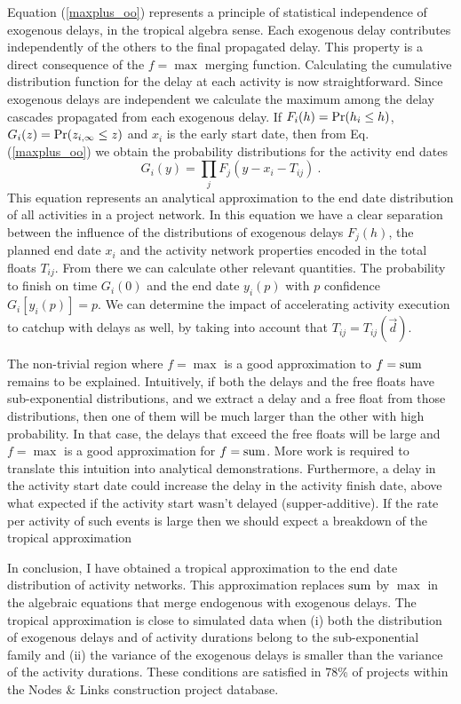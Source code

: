 \documentclass[reprint,aps,prl,amsmath,amssymb,superscriptaddress,showpacs]{revtex4-1}
\begin{document}
Equation (\ref{maxplus_oo}) represents a principle of statistical independence of exogenous delays, in the tropical algebra sense. Each exogenous delay contributes independently of the others to the final propagated delay. This property is a direct consequence of the $f=\max$ merging function. Calculating the cumulative distribution function for the delay at each activity is now straightforward. Since exogenous delays are independent we calculate the maximum among the delay cascades propagated from each exogenous delay.  If $F_i(h)={\rm Pr}(h_i\leq h)$, $G_i(z) = {\rm Pr}(z_{i,\infty}\leq z)$ and $x_i$ is the early start date, then from Eq. (\ref{maxplus_oo}) we obtain the probability distributions for the activity end dates
%
\begin{equation}
G_i(y) = \prod_{j} F_j(y-x_i-T_{ij})\ .
\label{CDF}
\end{equation}
%
This equation represents an analytical approximation to the end date distribution of all activities in a project network. In this equation we have a clear separation between the influence of the distributions of exogenous delays $F_j(h)$, the planned end date $x_i$ and the activity network properties encoded in the total floats $T_{ij}$. From there we can calculate other relevant quantities. The probability to finish on time $G_i(0)$ and the end date $y_i(p)$ with $p$ confidence $G_i[y_i(p)]=p$. We can determine the impact of accelerating activity execution to catchup with delays as well, by taking into account that $T_{ij}=T_{ij}(\vec{d})$.

The non-trivial region where $f=\max$ is a good approximation to $f={\rm sum}$ remains to be explained. Intuitively, if both the delays and the free floats have sub-exponential distributions, and we extract a delay and a free float from those distributions, then one of them will be much larger than the other with high probability. In that case, the delays that exceed the free floats will be large and $f=\max$ is a good approximation for $f={\rm sum}$. More work is required to translate this intuition into analytical demonstrations. Furthermore, a delay in the activity start date could increase the delay in the activity finish date, above what expected if the activity start wasn't delayed (supper-additive). If the rate per activity of such events is large then we should expect a breakdown of the tropical approximation

In conclusion, I have obtained a tropical approximation to the end date distribution of activity networks. This approximation replaces ${\rm sum}$ by $\max$ in the algebraic equations that merge endogenous with exogenous delays. The tropical approximation is close to simulated data when (i) both the distribution of exogenous delays and of activity durations belong to the sub-exponential family and (ii) the variance of the exogenous delays is smaller than the variance of the activity durations. These conditions are satisfied in 78\% of projects within the Nodes \& Links construction project database.
\end{document}
